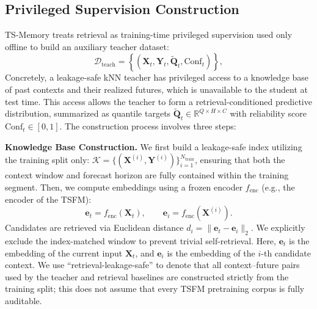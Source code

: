\subsection{Privileged Supervision Construction}
\label{sec:teacher}

TS-Memory treats retrieval as training-time privileged supervision used only offline to build an auxiliary teacher dataset:
\begin{equation}
\mathcal{D}_{\text{teach}}
=\left\{(\mathbf{X}_t,\mathbf{Y}_t,\widetilde{\mathbf{Q}}_t,\mathrm{Conf}_t)\right\},
\label{eq:tsm-dteach}
\end{equation}
Concretely, a leakage-safe kNN teacher has privileged access to a knowledge base of past contexts and their realized futures, which is unavailable to the student at test time. This access allows the teacher to form a retrieval-conditioned predictive distribution, summarized as quantile targets $\widetilde{\mathbf{Q}}_t\in\mathbb{R}^{Q\times H\times C}$ with reliability score $\mathrm{Conf}_t\in[0,1]$. The construction process involves three steps:


\noindent\textbf{Knowledge Base Construction.} We first build a leakage-safe index utilizing the training split only: $\mathcal{K}=\{(\mathbf{X}^{(i)},\mathbf{Y}^{(i)})\}_{i=1}^{N_{\text{train}}}$,
ensuring that both the context window and forecast horizon are fully contained within the training segment. Then, we compute embeddings using a frozen encoder $f_{\text{enc}}$ (e.g., the encoder of the TSFM):
\begin{equation}
\mathbf{e}_t=f_{\text{enc}}(\mathbf{X}_t), \qquad\mathbf{e}_i=f_{\text{enc}}(\mathbf{X}^{(i)}).
\label{eq:tsm-emb}
\end{equation}
Candidates are retrieved via Euclidean distance $d_i=\|\mathbf{e}_t-\mathbf{e}_i\|_2$. We explicitly exclude the index-matched window to prevent trivial self-retrieval. Here, $\mathbf{e}_t$ is the embedding of the current input $\mathbf{X}_t$, and $\mathbf{e}_i$ is the embedding of the $i$-th candidate context. We use “retrieval-leakage-safe” to denote that all context–future pairs used by the teacher and retrieval baselines are constructed strictly from the training split; this does not assume that every TSFM pretraining corpus is fully auditable.

